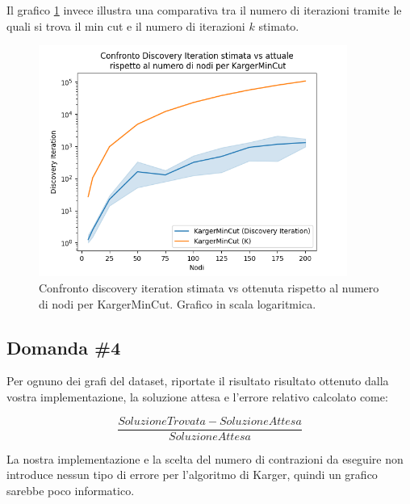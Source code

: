 Il grafico \ref{fig:karger-discovery-vs-estimated-k-chart} invece
illustra una comparativa tra il numero di iterazioni tramite le quali
si trova il min cut e il numero di iterazioni $k$ stimato.

\begin{figure}[!ht]
    \centering

    \includegraphics[width=0.9\textwidth]{./images/Confronto_Discovery_Iteration_stimata_vs_attuale__rispetto_al_numero_di_nodi_per_KargerMinCut.png}

    \caption{Confronto discovery iteration stimata vs ottenuta rispetto al numero di nodi per KargerMinCut. Grafico in scala logaritmica.}
    \label{fig:karger-discovery-vs-estimated-k-chart}
\end{figure}

\subsection{Domanda \#4}
\label{sec:question-4}

\begin{displayquote}
Per ognuno dei grafi del dataset, riportate il risultato risultato
ottenuto dalla vostra implementazione, la soluzione attesa e l'errore
relativo calcolato come:

\begin{equation*}
    \frac{SoluzioneTrovata - SoluzioneAttesa}{SoluzioneAttesa}
\end{equation*}

\end{displayquote}

\noindent La nostra implementazione e la scelta del numero di
contrazioni da eseguire non introduce nessun tipo di errore per
l'algoritmo di Karger, quindi un grafico sarebbe poco informatico.\\

